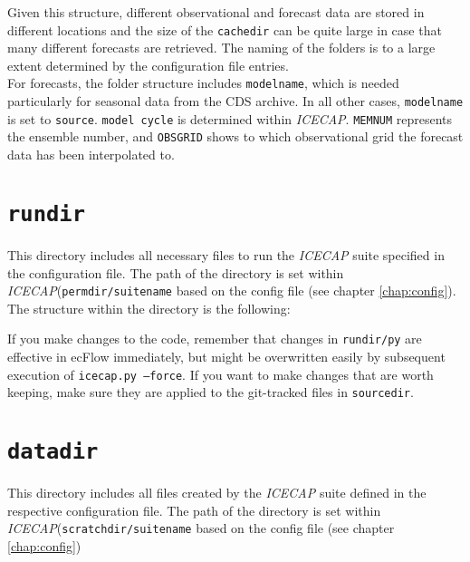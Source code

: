 \documentclass[DIV=10, parskip=full]{scrreprt}
\newcommand{\ice}{\textit{ICECAP}\xspace}
\begin{document}
Given this structure, different observational and forecast data are stored in different locations and the size of the \texttt{cachedir} can be quite large in case that many different forecasts are retrieved. The naming of the folders is to a large extent determined by the configuration file entries.\\
For forecasts, the folder structure includes \texttt{modelname}, which is needed particularly for seasonal data from the CDS archive. In all other cases, \texttt{modelname} is set to \texttt{source}. \texttt{model cycle} is determined within \ice. \texttt{MEMNUM} represents the ensemble number, and \texttt{OBSGRID} shows to which observational grid the forecast data has been interpolated to. 
	
\section{\texttt{rundir}}
This directory includes all necessary files to run the \ice suite specified in the configuration file. The path of the directory is set within \ice  (\texttt{permdir/suitename} based on the config file (see chapter \ref{chap:config}). The structure within the directory is the following:\\


If you make changes to the code, remember that changes in \texttt{rundir/py} are effective in ecFlow immediately, but might be overwritten easily by subsequent execution of \texttt{icecap.py --force}. If you want to make changes that are worth keeping, make sure they are applied to the git-tracked files in \texttt{sourcedir}.

\section{\texttt{datadir}}
This directory includes all files created by the \ice suite defined in the respective configuration file. The path of the directory is set within \ice  (\texttt{scratchdir/suitename} based on the config file (see chapter \ref{chap:config})\\

\end{document}
